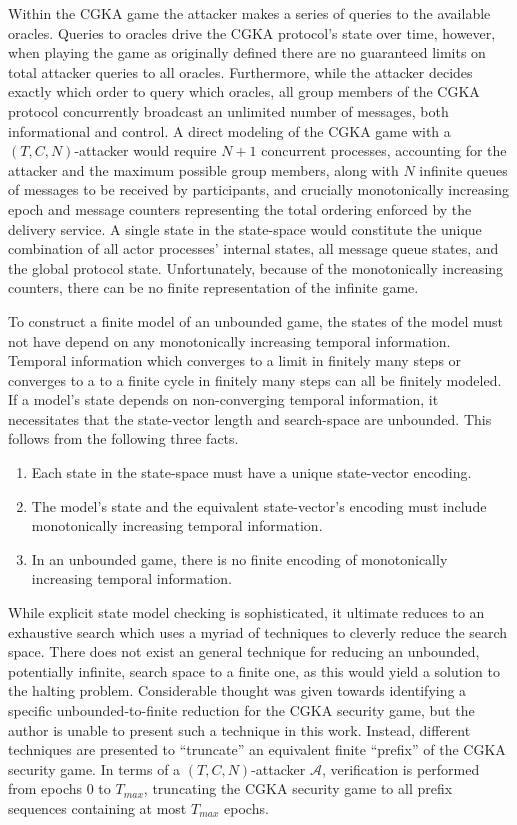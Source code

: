 Within the CGKA game the attacker makes a series of queries to the available oracles.
Queries to oracles drive the CGKA protocol's state over time, however, when playing the game as originally defined there are no guaranteed limits on total attacker queries to all oracles.
Furthermore, while the attacker decides exactly which order to query which oracles, all group members of the CGKA protocol concurrently broadcast an unlimited number of messages, both informational and control.
A direct modeling of the CGKA game with a \((T, C, N)\)-attacker would require \(N+1\) concurrent processes, accounting for the attacker and the maximum possible group members, along with \(N\) infinite queues of messages to be received by participants, and crucially monotonically increasing epoch and message counters representing the total ordering enforced by the delivery service.
A single state in the state-space would constitute the unique combination of all actor processes' internal states, all message queue states, and the global protocol state.
Unfortunately, because of the monotonically increasing counters, there can be no finite representation of the infinite game.

To construct a finite model of an unbounded game, the states of the model must not have depend on any monotonically increasing temporal information.
Temporal information which converges to a limit in finitely many steps or converges to a to a finite cycle in finitely many steps can all be finitely modeled.
If a model's state depends on non-converging temporal information, it necessitates that the state-vector length and search-space are unbounded.
This follows from the following three facts.

\begin{enumerate}
\def\labelenumi{\arabic{enumi}.}
\item
  Each state in the state-space must have a unique state-vector encoding.
\item
  The model's state and the equivalent state-vector's encoding must include monotonically increasing temporal information.
\item
  In an unbounded game, there is no finite encoding of monotonically increasing temporal information.
\end{enumerate}

While explicit state model checking is sophisticated, it ultimate reduces to an exhaustive search which uses a myriad of techniques to cleverly reduce the search space.
There does not exist an general technique for reducing an unbounded, potentially infinite, search space to a finite one, as this would yield a solution to the halting problem.
Considerable thought was given towards identifying a specific unbounded-to-finite reduction for the CGKA security game, but the author is unable to present such a technique in this work.
Instead, different techniques are presented to ``truncate'' an equivalent finite ``prefix'' of the CGKA security game.
In terms of a \((T, C, N)\)-attacker \(\mathcal{A}\), verification is performed from epochs $0$ to \(T_{max}\), truncating the CGKA security game to all prefix sequences containing at most \(T_{max}\) epochs.

